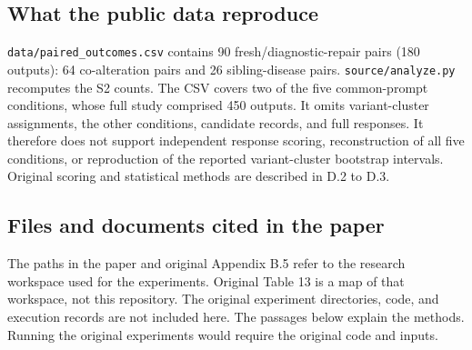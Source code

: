 \documentclass[11pt]{article}
\begin{document}
\subsection*{What the public data reproduce}
\texttt{data/paired\_outcomes.csv} contains 90 fresh/diagnostic-repair pairs
(180 outputs): 64 co-alteration pairs and 26 sibling-disease pairs.
\texttt{source/analyze.py} recomputes the S2 counts. The CSV covers two of the
five common-prompt conditions, whose full study comprised 450 outputs.
It omits variant-cluster assignments, the other conditions, candidate records,
and full responses. It therefore does not support independent response scoring,
reconstruction of all five conditions, or reproduction of the reported
variant-cluster bootstrap intervals. Original scoring and statistical methods
are described in D.2 to D.3.

\clearpage
\subsection*{Files and documents cited in the paper}

The paths in the paper and original Appendix B.5 refer to the research workspace
used for the experiments. Original Table 13 is a map of that workspace, not this
repository. The original experiment directories, code, and execution records are
not included here. The passages below explain the methods. Running the original experiments would
require the original code and inputs.
\end{document}
